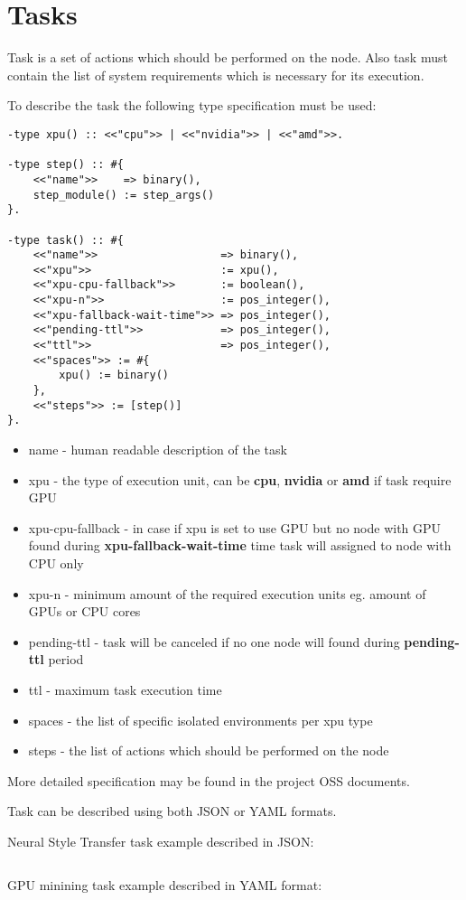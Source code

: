 \section{Tasks}

Task is a set of actions which should be performed on the node.
Also task must contain the list of system requirements which is necessary for its execution.

To describe the task the following type specification must be used:

\begin{verbatim}
-type xpu() :: <<"cpu">> | <<"nvidia">> | <<"amd">>.

-type step() :: #{
    <<"name">>    => binary(),
    step_module() := step_args()
}.

-type task() :: #{
    <<"name">>                   => binary(),
    <<"xpu">>                    := xpu(),
    <<"xpu-cpu-fallback">>       := boolean(),
    <<"xpu-n">>                  := pos_integer(),
    <<"xpu-fallback-wait-time">> => pos_integer(),
    <<"pending-ttl">>            => pos_integer(),
    <<"ttl">>                    => pos_integer(),
    <<"spaces">> := #{
        xpu() := binary()
    },
    <<"steps">> := [step()]
}.
\end{verbatim}

\begin{itemize}
    \item name - human readable description of the task
    \item xpu - the type of execution unit, can be \textbf{cpu}, \textbf{nvidia} or \textbf{amd} if task require GPU
    \item xpu-cpu-fallback - in case if xpu is set to use GPU but no node with GPU found during \textbf{xpu-fallback-wait-time} time task will assigned to node with CPU only
    \item xpu-n - minimum amount of the required execution units eg. amount of GPUs or CPU cores
    \item pending-ttl - task will be canceled if no one node will found during \textbf{pending-ttl} period
    \item ttl - maximum task execution time
    \item spaces - the list of specific isolated environments per xpu type
    \item steps - the list of actions which should be performed on the node
\end{itemize}

More detailed specification may be found in the project OSS\cite{oss} documents.

Task can be described using both JSON or YAML formats.

\newpage
Neural Style Transfer task example described in JSON:

\inputminted{json}{neural-style-task.json}

\newpage
GPU minining task example described in YAML format:

\inputminted{yaml}{claymore-cuda-mining-task.yaml}
